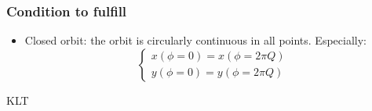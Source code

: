 \documentclass[12pt,a4paper]{memoir}
\begin{document}
\subsubsection{Condition to fulfill}
\begin{itemize}
	\item Closed orbit: the orbit is circularly continuous in all points. Especially:
	\begin{equation}
	\begin{cases}
	x(\phi = 0) = x(\phi = 2 \pi Q) \\
	y(\phi = 0) = y(\phi = 2 \pi Q)
	\end{cases}
	\end{equation}
\end{itemize}

KLT~\cite{book:wang_2012}


\end{document}
